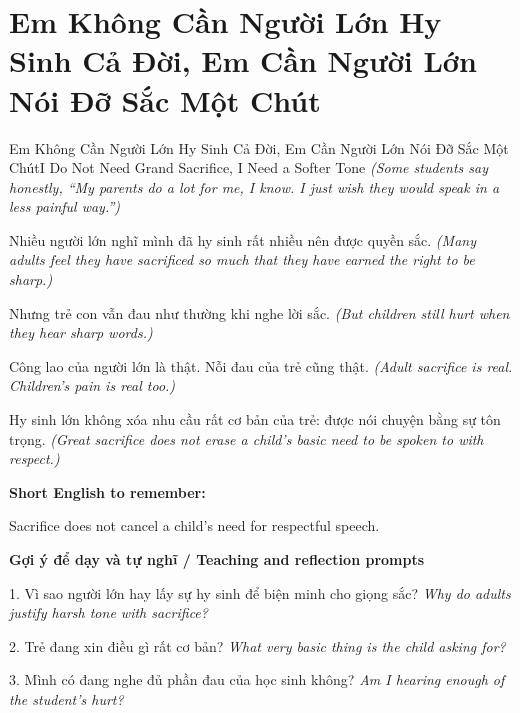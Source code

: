\section{Em Không Cần Người Lớn Hy Sinh Cả Đời, Em Cần Người Lớn Nói Đỡ Sắc Một Chút}
\begin{truyen}{Em Không Cần Người Lớn Hy Sinh Cả Đời, Em Cần Người Lớn Nói Đỡ Sắc Một Chút}{I Do Not Need Grand Sacrifice, I Need a Softer Tone}
\textit{(Some students say honestly, “My parents do a lot for me, I know. I just wish they would speak in a less painful way.”)}

Nhiều người lớn nghĩ mình đã hy sinh rất nhiều nên được quyền sắc.
\textit{(Many adults feel they have sacrificed so much that they have earned the right to be sharp.)}

Nhưng trẻ con vẫn đau như thường khi nghe lời sắc.
\textit{(But children still hurt when they hear sharp words.)}

Công lao của người lớn là thật. Nỗi đau của trẻ cũng thật.
\textit{(Adult sacrifice is real. Children's pain is real too.)}

\end{truyen}

\begin{baihoc}
Hy sinh lớn không xóa nhu cầu rất cơ bản của trẻ: được nói chuyện bằng sự tôn trọng.
\textit{(Great sacrifice does not erase a child's basic need to be spoken to with respect.)}
\end{baihoc}

\begin{ghinhoanh}
\textbf{Short English to remember:}

Sacrifice does not cancel a child's need for respectful speech.

\end{ghinhoanh}

\begin{tuhocnhanh}
\textbf{Gợi ý để dạy và tự nghĩ / Teaching and reflection prompts}

1. Vì sao người lớn hay lấy sự hy sinh để biện minh cho giọng sắc? \textit{Why do adults justify harsh tone with sacrifice?}

2. Trẻ đang xin điều gì rất cơ bản? \textit{What very basic thing is the child asking for?}

3. Mình có đang nghe đủ phần đau của học sinh không? \textit{Am I hearing enough of the student's hurt?}
\end{tuhocnhanh}
\ngancach

